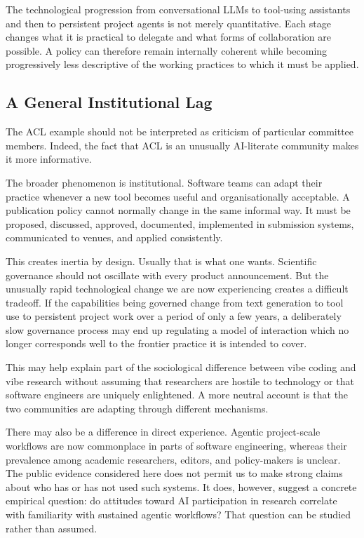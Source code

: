 \documentclass[12pt]{article}
\begin{document}
The technological progression from conversational LLMs to tool-using assistants and then to persistent project agents is not merely quantitative. Each stage changes what it is practical to delegate and what forms of collaboration are possible.
A policy can therefore remain internally coherent while becoming progressively less descriptive of the working practices to which it must be applied.


\subsection{A General Institutional Lag}

The ACL example should not be interpreted as criticism of particular committee members. Indeed, the fact that ACL is an unusually AI-literate community makes it more informative.

The broader phenomenon is institutional.
Software teams can adapt their practice whenever a new tool becomes useful and organisationally acceptable. A publication policy cannot normally change in the same informal way. It must be proposed, discussed, approved, documented, implemented in submission systems, communicated to venues, and applied consistently.

This creates inertia by design.
Usually that is what one wants. Scientific governance should not oscillate with every product announcement.
But the unusually rapid technological change we are now experiencing creates a difficult tradeoff. If the capabilities being governed change from text generation to tool use to persistent project work over a period of only a few years, a deliberately slow governance process may end up regulating a model of interaction which no longer corresponds well to the frontier practice it is intended to cover.

This may help explain part of the sociological difference between vibe coding and vibe research without assuming that researchers are hostile to technology or that software engineers are uniquely enlightened. A more neutral account is that the two communities are adapting through different mechanisms.

There may also be a difference in direct experience. Agentic project-scale workflows are now commonplace in parts of software engineering, whereas their prevalence among academic researchers, editors, and policy-makers is unclear. The public evidence considered here does not permit us to make strong claims about who has or has not used such systems.
It does, however, suggest a concrete empirical question: do attitudes toward AI participation in research correlate with familiarity with sustained agentic workflows?
That question can be studied rather than assumed.
\end{document}
